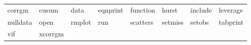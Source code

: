 \begin{tabular}{llllllll}
corrgm & cusum & data & eqnprint & function & hurst & include & leverage \\
nulldata & open & rmplot & run & scatters & setmiss & setobs & tabprint \\
vif & xcorrgm & \\
\end{tabular}

